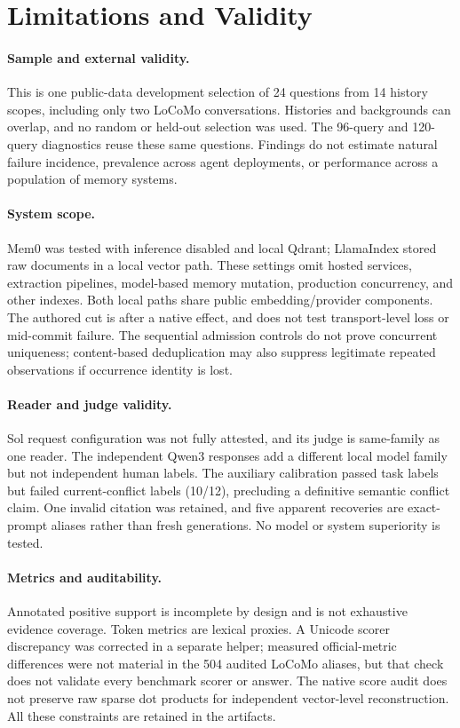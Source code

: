 \documentclass[10pt,letterpaper]{article}
\begin{document}
\section{Limitations and Validity}
\paragraph{Sample and external validity.} This is one public-data development selection of 24 questions from 14 history scopes, including only two LoCoMo conversations. Histories and backgrounds can overlap, and no random or held-out selection was used. The 96-query and 120-query diagnostics reuse these same questions. Findings do not estimate natural failure incidence, prevalence across agent deployments, or performance across a population of memory systems.

\paragraph{System scope.} Mem0 was tested with inference disabled and local Qdrant; LlamaIndex stored raw documents in a local vector path. These settings omit hosted services, extraction pipelines, model-based memory mutation, production concurrency, and other indexes. Both local paths share public embedding/provider components. The authored cut is after a native effect, and does not test transport-level loss or mid-commit failure. The sequential admission controls do not prove concurrent uniqueness; content-based deduplication may also suppress legitimate repeated observations if occurrence identity is lost.

\paragraph{Reader and judge validity.} Sol request configuration was not fully attested, and its judge is same-family as one reader. The independent Qwen3 responses add a different local model family but not independent human labels. The auxiliary calibration passed task labels but failed current-conflict labels (10/12), precluding a definitive semantic conflict claim. One invalid citation was retained, and five apparent recoveries are exact-prompt aliases rather than fresh generations. No model or system superiority is tested.

\paragraph{Metrics and auditability.} Annotated positive support is incomplete by design and is not exhaustive evidence coverage. Token metrics are lexical proxies. A Unicode scorer discrepancy was corrected in a separate helper; measured official-metric differences were not material in the 504 audited LoCoMo aliases, but that check does not validate every benchmark scorer or answer. The native score audit does not preserve raw sparse dot products for independent vector-level reconstruction. All these constraints are retained in the artifacts.
\end{document}
